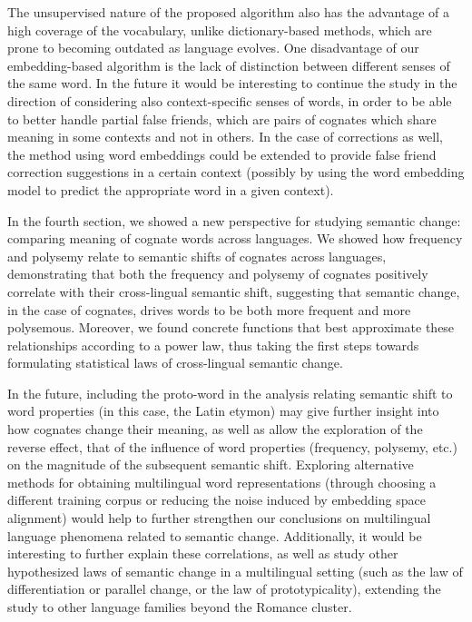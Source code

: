 \documentclass[output=paper]{langsci/langscibook}
\begin{document}
The unsupervised nature of the proposed algorithm also has the advantage of a high coverage of the vocabulary, unlike dictionary-based methods, which are prone to becoming outdated as language evolves. One disadvantage of our embedding-based algorithm is the lack of distinction between different senses of the same word. In the future it would be interesting to continue the study in the direction of considering also context-specific senses of words, in order to be able to better handle partial false friends, which are pairs of cognates which share meaning in some contexts and not in others. In the case of corrections as well, the method using word embeddings could be extended to provide false friend correction suggestions in a certain context (possibly by using the word embedding model to predict the appropriate word in a given context).

In the fourth section, we showed a new perspective for studying semantic change: comparing meaning of cognate words across languages.
We showed how frequency and polysemy relate to semantic shifts of cognates across languages, demonstrating that both the frequency and polysemy of cognates positively correlate with their cross-lingual semantic shift, suggesting that semantic change, in the case of cognates, drives words to be both more frequent and more polysemous. Moreover, we found concrete functions that best approximate these relationships according to a power law, thus taking the first steps towards formulating statistical laws of cross-lingual semantic change. 

In the future, including the proto-word in the analysis relating semantic shift to word properties (in this case, the Latin etymon) may give further insight into how cognates change their meaning, as well as allow the exploration of the reverse effect, that of the influence of word properties (frequency, polysemy, etc.) on the magnitude of the subsequent semantic shift.
 Exploring alternative methods for obtaining multilingual word representations (through choosing a different training corpus or reducing the noise induced by embedding space alignment) would help to further strengthen our conclusions on multilingual language phenomena related to semantic change. Additionally, it would be interesting to further explain these correlations, as well as study other hypothesized laws of semantic change in a multilingual setting (such as the law of differentiation or parallel change, or the law of prototypicality), extending the study to other language families beyond the Romance cluster. 
 
\end{document}
